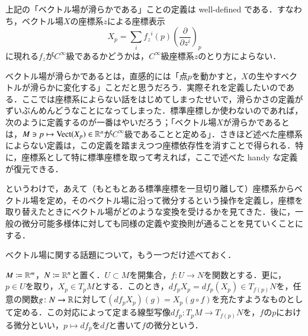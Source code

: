 \begin{que}
上記の「ベクトル場が滑らかである」ことの定義は well-defined である．すなわち，ベクトル場$X$の座標系$z$による座標表示
\begin{equation}
X_p = \sum_{i} {f_z}^i(p) \left( \frac{\partial}{\partial z^i} \right)_p
\end{equation}
に現れる$f_z$が$C^\infty$級であるかどうかは，$C^\infty$級座標系$z$のとり方によらない．
\end{que}

\begin{que}
ベクトル場が滑らかであるとは，直感的には「点$p$を動かすと，$X$の生やすベクトルが滑らかに変化する」ことだと思うだろう．実際それを定義したいのである．ここでは座標系によらない話をはじめてしまったせいで，滑らかさの定義がずいぶんめんどうなことになってしまった．標準座標しか使わないのであれば，次のように定義するのが一番はやいだろう；「ベクトル場$X$が滑らかであるとは，$M \ni p \mapsto \operatorname{Vect}(X_p) \in \mathbb{R}^n$が$C^\infty$級であることと定める」．さきほど述べた座標系によらない定義は，この定義を踏まえつつ座標依存性を消すことで得られる．特に，座標系として特に標準座標を取って考えれば，ここで述べた handy な定義が復元できる．
\end{que}

というわけで，あえて（もともとある標準座標を一旦切り離して）座標系からベクトル場を定め，そのベクトル場に沿って微分するという操作を定義し，座標を取り替えたときにベクトル場がどのような変換を受けるかを見てきた．後に，一般の微分可能多様体に対しても同様の定義や変換則が通ることを見ていくことにする．

ベクトル場に関する話題について，もう一つだけ述べておく．
\begin{defi}
$M \coloneqq \mathbb{R}^m$，$N \coloneqq \mathbb{R}^n$と置く．$U \subset M$を開集合，$f \colon U \to N$を関数とする．更に，$p \in U$を取り，$X_p \in T_pM$とする．このとき，$df_p X_p = df_p (X_p) \in T_{f(p)}N$を，任意の関数$g \colon N \to \mathbb{R}$に対して$(df_pX_p)(g) = X_p(g \circ f)$を充たすようなものとして定める．この対応によって定まる線型写像$df_p \colon T_pM \to T_{f(p)}N$を，$f$の$p$における微分といい，$p \mapsto df_p$を$df$と書いて$f$の微分という．
\end{defi}

